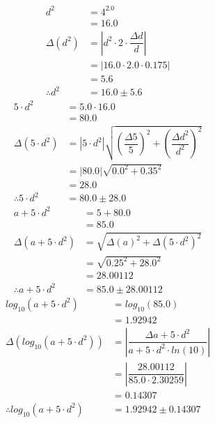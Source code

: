 \documentclass[a4paper]{article}
\begin{document}
\begin{align*}
d ^ { 2 } &= 4 ^ { 2.0 } \\
&= 16.0 \\[4mm]
\Delta \left( d ^ { 2 } \right) &= \left| d ^ { 2 } \cdot 2 \cdot \dfrac{ \Delta d }{ d } \right| \\
&= \left| 16.0 \cdot 2.0 \cdot 0.175 \right| \\
&= 5.6\\[4mm]
\therefore d ^ { 2 } &= 16.0 \pm 5.6
\end{align*}
\begin{align*}
5 \cdot d ^ { 2 } &= 5.0 \cdot 16.0 \\
&= 80.0 \\[4mm]
\Delta \left( 5 \cdot d ^ { 2 } \right) &= \left| 5 \cdot d ^ { 2 } \right|\sqrt{ \left( \dfrac{ \Delta 5 }{ 5 } \right) ^ { 2 } + \left( \dfrac{ \Delta d ^ { 2 } }{ d ^ { 2 } } \right) ^ { 2 }} \\
&= \left| 80.0 \right|\sqrt{ 0.0 ^ { 2 } + 0.35 ^ { 2 }} \\
&= 28.0\\[4mm]
\therefore 5 \cdot d ^ { 2 } &= 80.0 \pm 28.0
\end{align*}
\begin{align*}
a + 5 \cdot d ^ { 2 } &= 5 + 80.0 \\
&= 85.0 \\[4mm]
\Delta \left( a + 5 \cdot d ^ { 2 } \right) &= \sqrt{ \Delta \left( a \right) ^ { 2 } + \Delta \left( 5 \cdot d ^ { 2 } \right) ^ { 2 }} \\
&= \sqrt{ 0.25 ^ { 2 } + 28.0 ^ { 2 }} \\
&= 28.00112\\[4mm]
\therefore a + 5 \cdot d ^ { 2 } &= 85.0 \pm 28.00112
\end{align*}
\begin{align*}
log_{ 10 }\left( a + 5 \cdot d ^ { 2 } \right) &= log_{ 10 }\left( 85.0 \right) \\
&= 1.92942 \\[4mm]
\Delta \left( log_{ 10 }\left( a + 5 \cdot d ^ { 2 } \right) \right) &= \left| \dfrac{ \Delta a + 5 \cdot d ^ { 2 } }{ a + 5 \cdot d ^ { 2 } \cdot ln \left( 10 \right) } \right| \\
&= \left| \dfrac{ 28.00112 }{ 85.0 \cdot 2.30259 } \right| \\
&= 0.14307\\[4mm]
\therefore log_{ 10 }\left( a + 5 \cdot d ^ { 2 } \right) &= 1.92942 \pm 0.14307
\end{align*}
\end{document}
